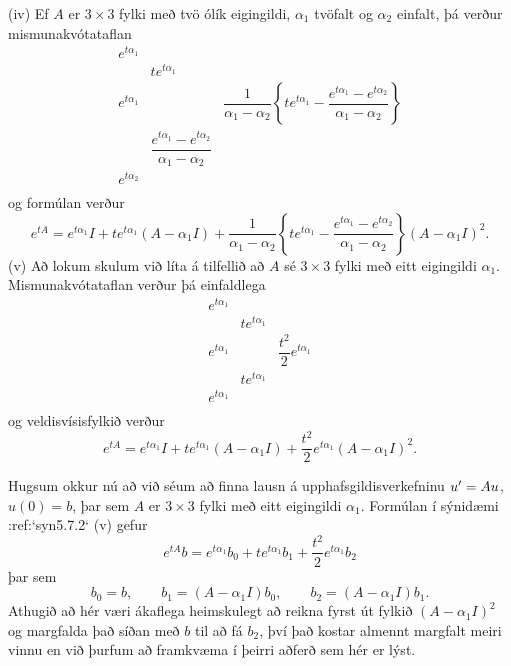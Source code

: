 (iv)  Ef $A$ er $3\times 3$ fylki með tvö ólík eigingildi,
$\alpha_1$ tvöfalt og $\alpha_2$ einfalt, þá verður
mismunakvótataflan 
 $$\begin{matrix}
e^{t\alpha_1}\\
&te^{t\alpha_1}\\
e^{t\alpha_1}& 
&\dfrac1{\alpha_1-\alpha_2}\left\{te^{t\alpha_1}-
\dfrac{e^{t\alpha_1}-e^{t\alpha_2}}{\alpha_1-\alpha_2}\right\}\\ 
&\dfrac{e^{t\alpha_1}-e^{t\alpha_2}}{\alpha_1-\alpha_2}\\
e^{t\alpha_2}\\
\end{matrix}
 $$
og formúlan verður
 $$e^{tA}=e^{t\alpha_1}I+te^{t\alpha_1}(A-\alpha_1I)+
\dfrac1{\alpha_1-\alpha_2}\left\{te^{t\alpha_1}-
\dfrac{e^{t\alpha_1}-e^{t\alpha_2}}{\alpha_1-\alpha_2}\right\}
(A-\alpha_1I)^2.
 $$
(v) Að lokum skulum við líta á tilfellið að $A$ sé $3\times 3$ fylki
með eitt eigingildi $\alpha_1$.  Mismunakvótataflan verður þá
einfaldlega
 $$\begin{matrix}
e^{t\alpha_1}\\
&te^{t\alpha_1}\\
e^{t\alpha_1}& 
&\dfrac{t^2}{2}e^{t\alpha_1}\\ 
&te^{t\alpha_1}\\
e^{t\alpha_1}\\
\end{matrix}
 $$
og veldisvísisfylkið verður
$$e^{tA}=e^{t\alpha_1}I+te^{t\alpha_1}(A-\alpha_1I)+
\dfrac{t^2}2e^{t\alpha_1}(A-\alpha_1I)^2.
 $$



Hugsum okkur nú að við séum að finna lausn á
upphafsgildisverkefninu $u{\sp{\prime}}=Au$, $u(0)=b$, þar sem $A$ er
$3\times 3$ fylki með eitt eigingildi $\alpha_1$.  Formúlan í
sýnidæmi :ref:`syn5.7.2` (v) gefur
 $$e^{tA}b=e^{t\alpha_1}b_0+te^{t\alpha_1}b_1+\dfrac {t^2}2e^{t\alpha_1}b_2
 $$
þar sem 
 $$b_0=b, \qquad b_1=(A-\alpha_1I)b_0, \qquad b_2=(A-\alpha_1I)b_1.
 $$
Athugið að hér væri ákaflega heimskulegt að reikna fyrst út fylkið
$(A-\alpha_1I)^2$ og margfalda það síðan með $b$ til að fá $b_2$, því
það kostar almennt margfalt meiri vinnu en við þurfum að framkvæma í
þeirri aðferð sem hér er lýst.



